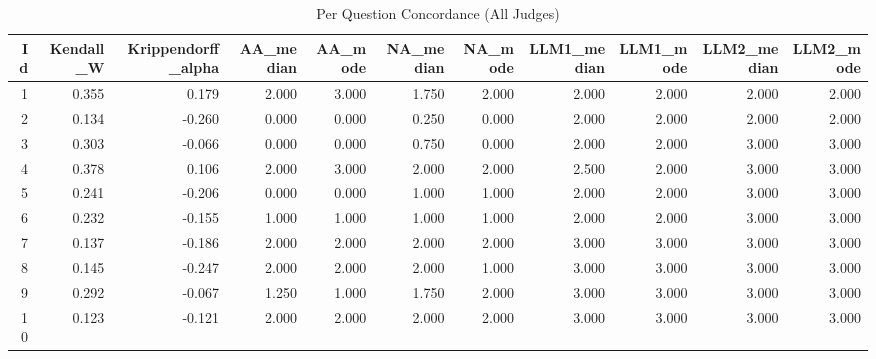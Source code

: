 \begin{table}
\caption{Per Question Concordance (All Judges)}
\label{tab:per_question_concordance_all_judges}
\begin{tabular}{rrrrrrrrrrr}
\toprule
Id & Kendall_W & Krippendorff_alpha & AA_median & AA_mode & NA_median & NA_mode & LLM1_median & LLM1_mode & LLM2_median & LLM2_mode \\
\midrule
1 & 0.355 & 0.179 & 2.000 & 3.000 & 1.750 & 2.000 & 2.000 & 2.000 & 2.000 & 2.000 \\
2 & 0.134 & -0.260 & 0.000 & 0.000 & 0.250 & 0.000 & 2.000 & 2.000 & 2.000 & 2.000 \\
3 & 0.303 & -0.066 & 0.000 & 0.000 & 0.750 & 0.000 & 2.000 & 2.000 & 3.000 & 3.000 \\
4 & 0.378 & 0.106 & 2.000 & 3.000 & 2.000 & 2.000 & 2.500 & 2.000 & 3.000 & 3.000 \\
5 & 0.241 & -0.206 & 0.000 & 0.000 & 1.000 & 1.000 & 2.000 & 2.000 & 3.000 & 3.000 \\
6 & 0.232 & -0.155 & 1.000 & 1.000 & 1.000 & 1.000 & 2.000 & 2.000 & 3.000 & 3.000 \\
7 & 0.137 & -0.186 & 2.000 & 2.000 & 2.000 & 2.000 & 3.000 & 3.000 & 3.000 & 3.000 \\
8 & 0.145 & -0.247 & 2.000 & 2.000 & 2.000 & 1.000 & 3.000 & 3.000 & 3.000 & 3.000 \\
9 & 0.292 & -0.067 & 1.250 & 1.000 & 1.750 & 2.000 & 3.000 & 3.000 & 3.000 & 3.000 \\
10 & 0.123 & -0.121 & 2.000 & 2.000 & 2.000 & 2.000 & 3.000 & 3.000 & 3.000 & 3.000 \\
\bottomrule
\end{tabular}
\end{table}

